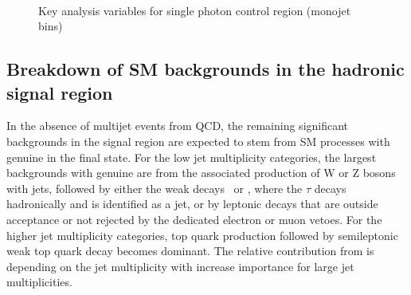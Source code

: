 \begin{figure}
\begin{center}
         \\
        \caption{Key analysis variables for single photon control region (monojet bins)}
        \label{fig:distribution_singlephoton_mono}
    \end{center}
\end{figure}

\clearpage

\subsection{Breakdown of SM backgrounds in the hadronic signal
  region\label{sec:bkgd-comp}}

In the absence of multijet events from QCD, the remaining significant
backgrounds in the signal region are expected to stem from SM
processes with genuine \met in the final state. For the low jet
multiplicity categories, the largest backgrounds with genuine \met are
 from the associated production of W or Z bosons with jets,
followed by either the weak decays \znunu\ or \wtaunu, where the
$\tau$ decays hadronically and is identified as a jet, or by leptonic
decays that are outside acceptance or not rejected by the dedicated
electron or muon vetoes. For the higher jet multiplicity categories,
top quark production followed by semileptonic weak top quark decay
becomes dominant. The relative contribution from \ttbar is depending on 
the jet multiplicity with increase importance for large jet multiplicities.


